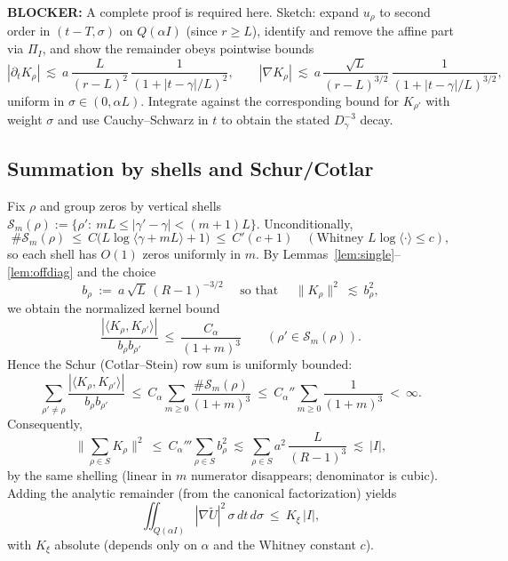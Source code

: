 \noindent\textbf{BLOCKER:} A complete proof is required here. Sketch: expand $u_\rho$ to second order in $(t{-}T,\sigma)$ on $Q(\alpha I)$ (since $r\ge L$), identify and remove the affine part via $\Pi_I$, and show the remainder obeys pointwise bounds
\[
 |\partial_t K_\rho|\ \lesssim\ a\,\frac{L}{(r-L)^2}\,\frac{1}{(1+|t-\gamma|/L)^2},\qquad
 |\nabla K_\rho|\ \lesssim\ a\,\frac{\sqrt{L}}{(r-L)^{3/2}}\,\frac{1}{(1+|t-\gamma|/L)^{3/2}},
\]
uniform in $\sigma\in(0,\alpha L)$. Integrate against the corresponding bound for $K_{\rho'}$ with weight $\sigma$ and use Cauchy–Schwarz in $t$ to obtain the stated $D_\gamma^{-3}$ decay.

\subsection*{Summation by shells and Schur/Cotlar}
Fix $\rho$ and group zeros by vertical shells $\mathcal S_m(\rho):=\{\rho':\ mL\le |\gamma'-\gamma|<(m{+}1)L\}$. Unconditionally,
\[
 \#\mathcal S_m(\rho)\ \le\ C\big(L\log\langle \gamma+mL\rangle +1\big)\ \le\ C'(c+1)\quad(\text{Whitney }L\log\langle\cdot\rangle\le c),
\]
so each shell has $O(1)$ zeros uniformly in $m$. By Lemmas~\ref{lem:single}–\ref{lem:offdiag} and the choice
\[
 b_\rho\ :=\ a\,\sqrt{L}\,(R-1)^{-3/2}\quad\text{ so that }\quad
 \|K_\rho\|^2\ \lesssim\ b_\rho^2,
\]
we obtain the normalized kernel bound
\[
 \frac{|\langle K_\rho,K_{\rho'}\rangle|}{b_\rho b_{\rho'}}\ \le\ \frac{C_\alpha}{(1+m)^3}\qquad
 (\rho'\in \mathcal S_m(\rho)).
\]
Hence the Schur (Cotlar–Stein) row sum is uniformly bounded:
\[
 \sum_{\rho'\ne \rho}\frac{|\langle K_\rho,K_{\rho'}\rangle|}{b_\rho b_{\rho'}}
 \ \le\ C_\alpha\sum_{m\ge 0}\frac{\#\mathcal S_m(\rho)}{(1+m)^3}
 \ \le\ C_\alpha''\sum_{m\ge 0}\frac{1}{(1+m)^3}\ <\ \infty.
\]
Consequently,
\[
 \Big\|\sum_{\rho\in S} K_\rho\Big\|^2\ \le\ C_\alpha'''\sum_{\rho\in S} b_\rho^2
 \ \lesssim\ \sum_{\rho\in S} a^2\,\frac{L}{(R-1)^{3}}
 \ \lesssim\ |I|,
\]
by the same shelling (linear in $m$ numerator disappears; denominator is cubic). Adding the analytic remainder (from the canonical factorization) yields
\[
 \iint_{Q(\alpha I)} |\nabla \widetilde U|^2\,\sigma\,dt\,d\sigma\ \le\ K_\xi\,|I|,
\]
with $K_\xi$ absolute (depends only on $\alpha$ and the Whitney constant $c$). 
